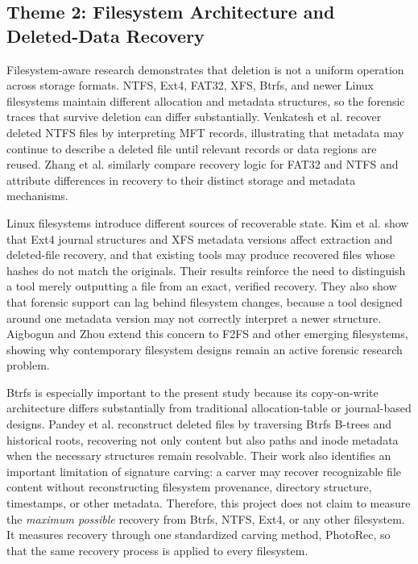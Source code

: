\documentclass[conference]{IEEEtran}
\begin{document}
\subsection{Theme 2: Filesystem Architecture and Deleted-Data Recovery}

Filesystem-aware research demonstrates that deletion is not a uniform operation across storage formats. NTFS, Ext4, FAT32, XFS, Btrfs, and newer Linux filesystems maintain different allocation and metadata structures, so the forensic traces that survive deletion can differ substantially. Venkatesh et al. \cite{venkatesh2024ntfs} recover deleted NTFS files by interpreting MFT records, illustrating that metadata may continue to describe a deleted file until relevant records or data regions are reused. Zhang et al. \cite{zhang2020windows} similarly compare recovery logic for FAT32 and NTFS and attribute differences in recovery to their distinct storage and metadata mechanisms.

Linux filesystems introduce different sources of recoverable state. Kim et al. \cite{kim2021ext4xfs} show that Ext4 journal structures and XFS metadata versions affect extraction and deleted-file recovery, and that existing tools may produce recovered files whose hashes do not match the originals. Their results reinforce the need to distinguish a tool merely outputting a file from an exact, verified recovery. They also show that forensic support can lag behind filesystem changes, because a tool designed around one metadata version may not correctly interpret a newer structure. Aigbogun and Zhou \cite{aigbogun2025f2fs} extend this concern to F2FS and other emerging filesystems, showing why contemporary filesystem designs remain an active forensic research problem.

Btrfs is especially important to the present study because its copy-on-write architecture differs substantially from traditional allocation-table or journal-based designs. Pandey et al. \cite{pandey2026btrfs} reconstruct deleted files by traversing Btrfs B-trees and historical roots, recovering not only content but also paths and inode metadata when the necessary structures remain resolvable. Their work also identifies an important limitation of signature carving: a carver may recover recognizable file content without reconstructing filesystem provenance, directory structure, timestamps, or other metadata. Therefore, this project does not claim to measure the \emph{maximum possible} recovery from Btrfs, NTFS, Ext4, or any other filesystem. It measures recovery through one standardized carving method, PhotoRec, so that the same recovery process is applied to every filesystem.
\end{document}
